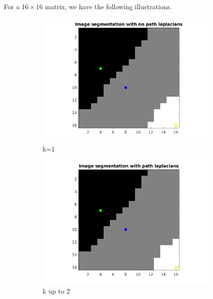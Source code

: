 \documentclass[10pt,a4paper]{article}
\begin{document}
\vspace*{2cm}
For a $16 \times 16 $ matrix, we have the following illustrations.

\begin{figure}[H]
	\centering
	\begin{subfigure}[b]{0.45\textwidth}
		\includegraphics[width=\textwidth]{segmentation-images/16by16longrange1-s2.png}
		\caption{k=1}
	\end{subfigure}
	\begin{subfigure}[b]{0.45\textwidth}
		\includegraphics[width=\textwidth]{segmentation-images/16by16longrange2-s2.png}
		\caption{k up to 2}
	\end{subfigure} \\
	\begin{subfigure}[b]{0.45\textwidth}

\end{subfigure}
\end{figure}
\end{document}
